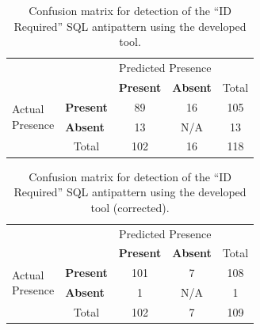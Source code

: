 \begin{table}[H]
    \centering
    \caption{Confusion matrix for detection of the “ID Required” SQL antipattern using the developed tool.}
    \label{tab:idRequiredConfusion}
    \begin{tabular}{l|l|c|c|c}
        \multicolumn{2}{c}{}&\multicolumn{2}{c}{Predicted Presence}&\\
        \cline{3-4}
        \multicolumn{2}{c|}{}&\textbf{Present}&\textbf{Absent}&\multicolumn{1}{c}{Total}\\
        \cline{2-4}
        \multirow{2}{1.5cm}{Actual\\Presence}& \textbf{Present} & 89 & 16 & 105\\
        \cline{2-4}
        & \textbf{Absent} & 13 & N/A & 13\\
        \cline{2-4}
        \multicolumn{1}{c}{} & \multicolumn{1}{c}{Total} & \multicolumn{1}{c}{102} & \multicolumn{1}{c}{16} & \multicolumn{1}{c}{118}\\
    \end{tabular}
\end{table}

\begin{table}[H]
    \centering
    \caption{Confusion matrix for detection of the “ID Required” SQL antipattern using the developed tool (corrected).}
    \label{tab:idRequiredConfusionCorrected}
    \begin{tabular}{l|l|c|c|c}
        \multicolumn{2}{c}{}&\multicolumn{2}{c}{Predicted Presence}&\\
        \cline{3-4}
        \multicolumn{2}{c|}{}&\textbf{Present}&\textbf{Absent}&\multicolumn{1}{c}{Total}\\
        \cline{2-4}
        \multirow{2}{1.5cm}{Actual\\Presence}& \textbf{Present} & 101 & 7 & 108\\
        \cline{2-4}
        & \textbf{Absent} & 1 & N/A & 1\\
        \cline{2-4}
        \multicolumn{1}{c}{} & \multicolumn{1}{c}{Total} & \multicolumn{1}{c}{102} & \multicolumn{1}{c}{7} & \multicolumn{1}{c}{109}\\
    \end{tabular}
\end{table}

